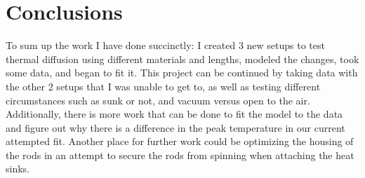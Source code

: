 \documentclass[11pt,a4paper,notitlepage,fleqn]{article}
\begin{document}
	\section{Conclusions}
	To sum up the work I have done succinctly: I created 3 new setups to test thermal diffusion using different materials and lengths, modeled the changes, took some data, and began to fit it. This project can be continued by taking data with the other 2 setups that I was unable to get to, as well as testing different circumstances such as sunk or not, and vacuum versus open to the air. Additionally, there is more work that can be done to fit the model to the data and figure out why there is a difference in the peak temperature in our current attempted fit. Another place for further work could be optimizing the housing of the rods in an attempt to secure the rods from spinning when attaching the heat sinks.
\end{document}
